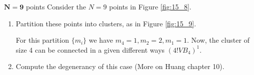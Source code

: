 \documentclass[../../Main/Main.tex]{subfiles}
\begin{document}
\begin{figure}[H]
\begin{minipage}[c]{0.5\linewidth}
\end{minipage}
\begin{minipage}[]{0.5\linewidth}
\centering
{}
\end{minipage}
\caption{\label{fig:} }
\end{figure}


\begin{exercise}{\( \pmb{N=9} \) points}{}
Consider the \( N=9 \) points in Figure \ref{fig:15_8}.
  \begin{enumerate}
  \item Partition these points into clusters, as in Figure \ref{fig:15_9}.

   For this partition \( \{ m_i \}   \) we have \( m_4=1,m_2=2,m_1=1 \). Now, the cluster of size 4 can be connected in a given different ways \( (4! V B_4)^1 \).
   \item Compute the degenerancy of this case (More on Huang chapter 10).
  \end{enumerate}
\end{exercise}
\end{document}
